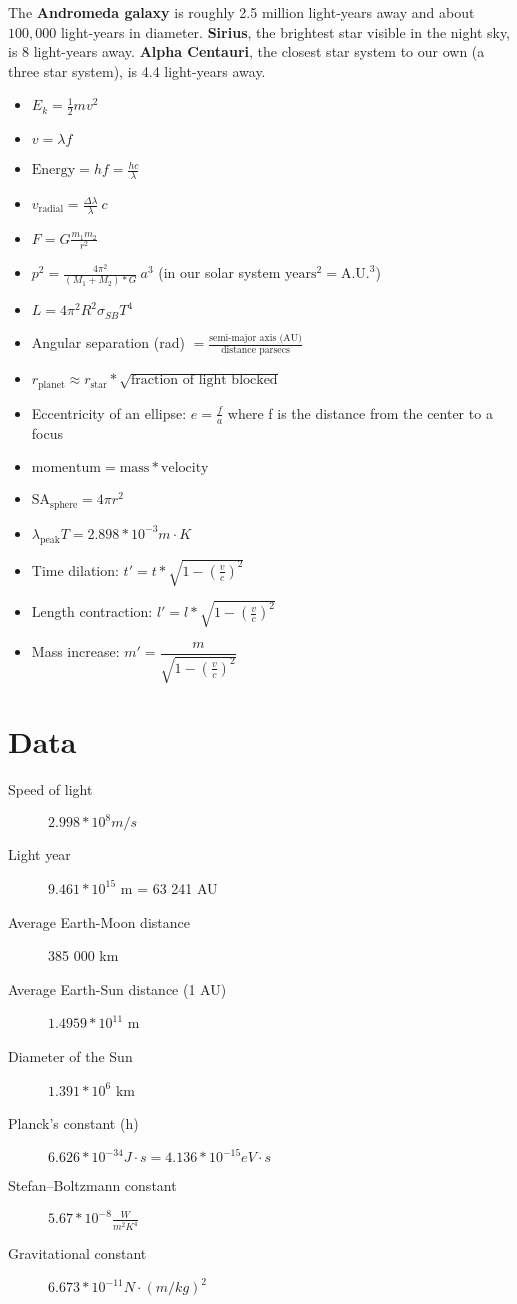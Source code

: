 \documentclass[12pt]{article}
\begin{document}
The {\bf Andromeda galaxy} is roughly 2.5 million light-years away and about $100,000$ light-years in diameter. {\bf Sirius}, the brightest star visible in the night sky, is 8 light-years away. {\bf Alpha Centauri}, the closest star system to our own (a three star system), is 4.4 light-years away.

\begin{itemize}
    \item $E_k = \frac{1}{2}mv^2$
    \item $v = \lambda f$
    \item $\text{Energy} = h f = \frac{hc}{\lambda}$
    \item $v_\text{radial} = \frac{\Delta \lambda}{\lambda}\ c$
    \item $F = G\frac{m_1 m_2}{r^2}$
    \item $p^2 = \frac{4\pi^2}{(M_1 + M_2) * G}\ a^3$ (in our solar system $\text{years}^2 = \text{A.U.}^3$)
    \item $L = 4\pi^2R^2 \sigma_{SB} T^4$
    \item Angular separation (rad) $= \frac{\text{semi-major axis (AU)}}{\text{distance parsecs}}$
    \item $r_\text{planet} \approx r_\text{star} * \sqrt{\text{fraction of light blocked}}$
    \item Eccentricity of an ellipse: $e = \frac{f}{a}$ where f is the distance from the center to a focus
    \item $\text{momentum} = \text{mass} * \text{velocity}$
    \item $\text{SA}_\text{sphere} = 4 \pi r^2$
    \item $\lambda_\text{peak} T = 2.898 * 10^{-3} m \cdot K$
    \item Time dilation: $t' = t * \sqrt{1 - \left( \frac{v}{c} \right)^2}$
    \item Length contraction: $l' = l * \sqrt{1 - \left( \frac{v}{c} \right)^2}$
    \item Mass increase: $m' = \dfrac{m}{\sqrt{1 - \left( \frac{v}{c} \right)^2}}$
\end{itemize}

\section{Data}

\begin{description}
    \item[Speed of light] $2.998 * 10^8 m/s$
    \item[Light year] $9.461 * 10^{15}$ m = 63 241 AU
    \item[Average Earth-Moon distance] 385 000 km
    \item[Average Earth-Sun distance (1 AU)] $1.4959 * 10^{11}$ m
    \item[Diameter of the Sun] $1.391 * 10^6$ km
    \item[Planck's constant (h)] $6.626 * 10^{-34} J \cdot s = 4.136 * 10^{-15} eV \cdot s$
    \item[Stefan–Boltzmann constant] $5.67 * 10^{-8} \frac{W}{m^2 K^4}$
    \item[Gravitational constant] $6.673 * 10^{-11} N \cdot (m/kg)^2$
\end{description}
\end{document}
